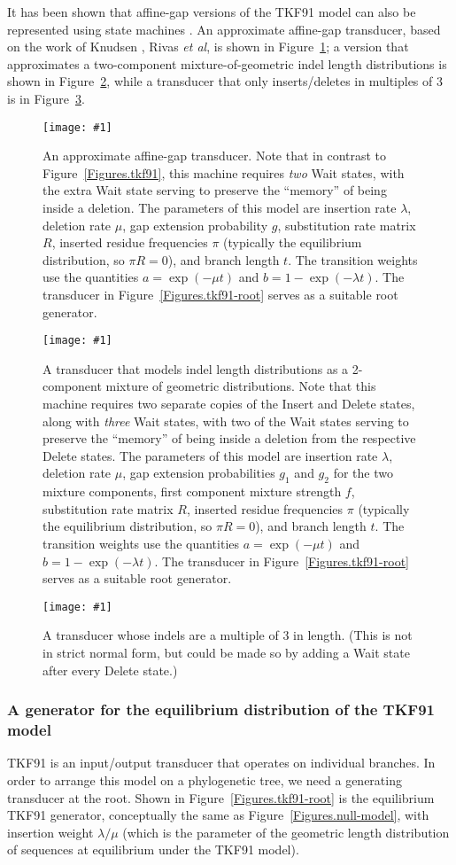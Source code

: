 \documentclass{article}
\newcommand{\figref}[1]{Figure~\ref{Figures.#1}}
\newcommand{\figlabel}[1]{\label{Figures.#1}}
\newcommand{\easyfig}[4]{
\begin{figure}
\texttt{[image: \#1]}
\caption{ \figlabel{#3} #4}
\end{figure}}
\newcommand{\pdffig}[2]{\easyfig{#1-fig.pdf}{}{#1}{#2}}
\newcommand{\widepdffig}[2]{\easyfig{#1-fig.pdf}{width=\textwidth}{#1}{#2}}
\newcommand{\tallpdffig}[2]{\easyfig{#1-fig.pdf}{height=.8\textheight}{#1}{#2}}
\begin{document}
It has been shown that affine-gap versions of the TKF91 model can also be represented using state machines \cite{MiklosLunterHolmes2004}.
An approximate affine-gap transducer, based on the work of Knudsen \cite{KnudsenMiyamoto2003}, Rivas \cite{Rivas05} {\em et al}, is shown in \figref{protpal};
a version that approximates a two-component mixture-of-geometric indel length distributions is shown in \figref{protpal-mix2},
while a transducer that only inserts/deletes in multiples of 3 is in \figref{triplet}.

\pdffig{protpal}{An approximate affine-gap transducer.
Note that in contrast to \figref{tkf91}, this machine requires {\em two} Wait states,
with the extra Wait state serving to preserve the ``memory'' of being inside a deletion.
The parameters of this model are insertion rate $\lambda$, deletion rate $\mu$, gap extension probability $g$,
substitution rate matrix $R$, inserted residue frequencies $\pi$ (typically the equilibrium distribution, so $\pi R = 0$), and branch length $t$.
The transition weights use the quantities
$a = \exp(-\mu t)$ and $b = 1 - \exp(-\lambda t)$.
The transducer in \figref{tkf91-root} serves as a suitable root generator.
}

\widepdffig{protpal-mix2}{A transducer that models indel length distributions as a 2-component mixture of geometric distributions.
Note that this machine requires
two separate copies of the Insert and Delete states, along with {\em three} Wait states,
with two of the Wait states serving to preserve the ``memory'' of being inside a deletion from the respective Delete states.
The parameters of this model are insertion rate $\lambda$, deletion rate $\mu$, gap extension probabilities $g_1$ and $g_2$ for the two mixture components,
first component mixture strength $f$, substitution rate matrix $R$, inserted residue frequencies $\pi$ (typically the equilibrium distribution, so $\pi R = 0$), and branch length $t$.
The transition weights use the quantities
$a = \exp(-\mu t)$ and $b = 1 - \exp(-\lambda t)$.
The transducer in \figref{tkf91-root} serves as a suitable root generator.
}

\tallpdffig{triplet}{A transducer whose indels are a multiple of 3 in length.
(This is not in strict normal form, but could be made so by adding a Wait state after every Delete state.)}

\subsubsection{A generator for the equilibrium distribution of the TKF91 model}
TKF91 is an input/output transducer that
operates on individual branches.  In order to arrange this model on a phylogenetic tree,
we need a generating transducer at the root.  
Shown in \figref{tkf91-root} is the equilibrium TKF91 generator, conceptually the same as
\figref{null-model}, with insertion weight $\lambda/\mu$
(which is the parameter of the geometric length distribution of sequences at equilibrium under the TKF91 model).
\end{document}
